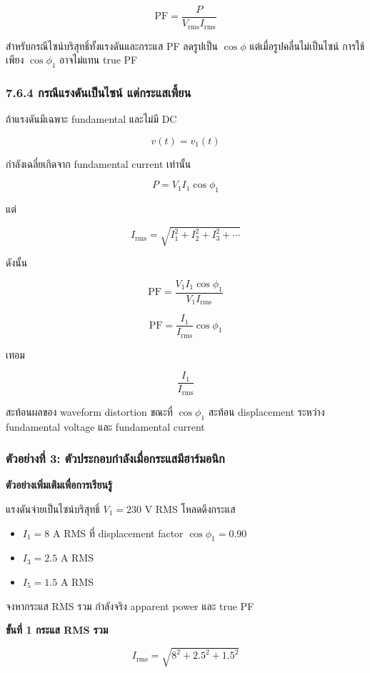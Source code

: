 \[
\mathrm{PF}=\frac{P}{V_{\mathrm{rms}}I_{\mathrm{rms}}}
\]

สำหรับกรณีไซน์บริสุทธิ์ทั้งแรงดันและกระแส PF ลดรูปเป็น $\cos\phi$ แต่เมื่อรูปคลื่นไม่เป็นไซน์ การใช้เพียง $\cos\phi_1$ อาจไม่แทน true PF

\subsubsection{7.6.4 กรณีแรงดันเป็นไซน์ แต่กระแสเพี้ยน}

ถ้าแรงดันมีเฉพาะ fundamental และไม่มี DC

\[
v(t)=v_1(t)
\]

กำลังเฉลี่ยเกิดจาก fundamental current เท่านั้น

\[
P=V_1I_1\cos\phi_1
\]

แต่

\[
I_{\mathrm{rms}}=\sqrt{I_1^2+I_2^2+I_3^2+\cdots}
\]

ดังนั้น

\[
\mathrm{PF}=\frac{V_1I_1\cos\phi_1}{V_1I_{\mathrm{rms}}}
\]

\[
\mathrm{PF}=\frac{I_1}{I_{\mathrm{rms}}}\cos\phi_1
\]

เทอม

\[
\frac{I_1}{I_{\mathrm{rms}}}
\]

สะท้อนผลของ waveform distortion ขณะที่ $\cos\phi_1$ สะท้อน displacement ระหว่าง fundamental voltage และ fundamental current

\subsubsection{ตัวอย่างที่ 3: ตัวประกอบกำลังเมื่อกระแสมีฮาร์มอนิก}

\textbf{ตัวอย่างเพิ่มเติมเพื่อการเรียนรู้}

แรงดันจ่ายเป็นไซน์บริสุทธิ์ $V_1=230$ V RMS โหลดดึงกระแส

\begin{itemize}
    \item $I_1=8$ A RMS ที่ displacement factor $\cos\phi_1=0.90$
    \item $I_3=2.5$ A RMS
    \item $I_5=1.5$ A RMS
\end{itemize}

จงหากระแส RMS รวม กำลังจริง apparent power และ true PF

\textbf{ขั้นที่ 1 กระแส RMS รวม}

\[
I_{\mathrm{rms}}=\sqrt{8^2+2.5^2+1.5^2}
\]

